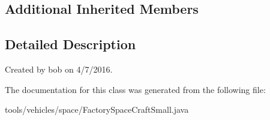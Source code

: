 \subsection*{Additional Inherited Members}


\subsection{Detailed Description}
Created by bob on 4/7/2016. 

The documentation for this class was generated from the following file\+:\begin{DoxyCompactItemize}
\item 
tools/vehicles/space/Factory\+Space\+Craft\+Small.\+java\end{DoxyCompactItemize}
